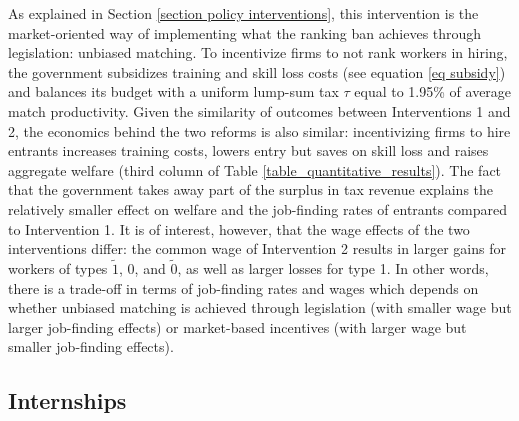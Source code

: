 \documentclass[12pt]{article} %
\theoremstyle{definition}
\begin{document}
As explained in Section \ref{section policy interventions}, this intervention is the market-oriented way of implementing what the ranking ban achieves through legislation: unbiased matching.
To incentivize firms to not rank workers in hiring, the government subsidizes training and skill loss costs (see equation \ref{eq subsidy}) and balances its budget with a uniform lump-sum tax $\tau$ equal to 1.95\% of average match productivity.  
Given the similarity of outcomes between Interventions 1 and 2, the economics behind the two reforms is also similar: incentivizing firms to hire entrants increases training costs, lowers entry but saves on skill loss and raises aggregate welfare (third column of Table \ref{table_quantitative_results}).
The fact that the government takes away part of the surplus in tax revenue explains the relatively smaller effect on welfare and the job-finding rates of entrants compared to Intervention 1.
It is of interest, however, that the wage effects of the two interventions differ: the common wage of Intervention 2 results in larger gains for workers of types $\tilde{1}$, 0, and $\tilde{0}$, as well as larger losses for type 1.
In other words, there is a trade-off in terms of job-finding rates and wages which depends on whether unbiased matching is achieved through legislation (with smaller wage but larger job-finding effects) or market-based incentives (with larger wage but smaller job-finding effects).



\subsection{Internships} \label{section internships quant}
\end{document}
